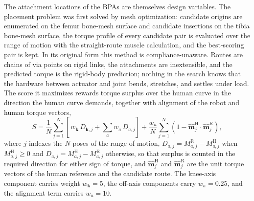 The attachment locations of the BPAs are themselves design variables. The placement problem was first solved by mesh optimization: candidate origins are enumerated on the femur bone-mesh surface and candidate insertions on the tibia bone-mesh surface, the torque profile of every candidate pair is evaluated over the range of motion with the straight-route muscle calculation, and the best-scoring pair is kept. In its original form this method is compliance-unaware. Routes are chains of via points on rigid links, the attachments are inextensible, and the predicted torque is the rigid-body prediction; nothing in the search knows that the hardware between actuator and joint bends, stretches, and settles under load. The score it maximizes rewards torque surplus over the human curve in the direction the human curve demands, together with alignment of the robot and human torque vectors,
\begin{equation}
S = \frac{1}{N}\sum_{j=1}^{N}\left[\,w_{\mathbf{k}}\,D_{\mathbf{k},j} + \sum_{a} w_{a}\,D_{a,j}\right] + \frac{w_{u}}{N}\sum_{j=1}^{N}\left(1 - \hat{\mathbf{m}}^{\mathrm{H}}_{j}\cdot\hat{\mathbf{m}}^{\mathrm{R}}_{j}\right),
\label{eq:mesh_reward}
\end{equation}
where $j$ indexes the $N$ poses of the range of motion, $D_{a,j} = M^{\mathrm{R}}_{a,j} - M^{\mathrm{H}}_{a,j}$ when $M^{\mathrm{H}}_{a,j} \geq 0$ and $D_{a,j} = M^{\mathrm{H}}_{a,j} - M^{\mathrm{R}}_{a,j}$ otherwise, so that surplus is counted in the required direction for either sign of torque, and $\hat{\mathbf{m}}^{\mathrm{H}}_{j}$ and $\hat{\mathbf{m}}^{\mathrm{R}}_{j}$ are the unit torque vectors of the human reference and the candidate route. The knee-axis component carries weight $w_{\mathbf{k}} = 5$, the off-axis components carry $w_{a} = 0.25$, and the alignment term carries $w_{u} = 10$.

